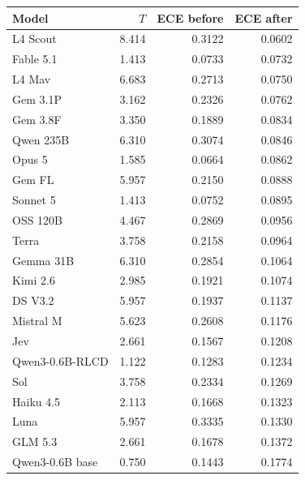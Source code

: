 \begin{tabular}{lrrr}
\toprule
Model & $T$ & ECE before & ECE after \\
\midrule
L4 Scout & 8.414 & 0.3122 & 0.0602 \\
Fable 5.1 & 1.413 & 0.0733 & 0.0732 \\
L4 Mav & 6.683 & 0.2713 & 0.0750 \\
Gem 3.1P & 3.162 & 0.2326 & 0.0762 \\
Gem 3.8F & 3.350 & 0.1889 & 0.0834 \\
Qwen 235B & 6.310 & 0.3074 & 0.0846 \\
Opus 5 & 1.585 & 0.0664 & 0.0862 \\
Gem FL & 5.957 & 0.2150 & 0.0888 \\
Sonnet 5 & 1.413 & 0.0752 & 0.0895 \\
OSS 120B & 4.467 & 0.2869 & 0.0956 \\
Terra & 3.758 & 0.2158 & 0.0964 \\
Gemma 31B & 6.310 & 0.2854 & 0.1064 \\
Kimi 2.6 & 2.985 & 0.1921 & 0.1074 \\
DS V3.2 & 5.957 & 0.1937 & 0.1137 \\
Mistral M & 5.623 & 0.2608 & 0.1176 \\
Jev & 2.661 & 0.1567 & 0.1208 \\
Qwen3-0.6B-RLCD & 1.122 & 0.1283 & 0.1234 \\
Sol & 3.758 & 0.2334 & 0.1269 \\
Haiku 4.5 & 2.113 & 0.1668 & 0.1323 \\
Luna & 5.957 & 0.3335 & 0.1330 \\
GLM 5.3 & 2.661 & 0.1678 & 0.1372 \\
Qwen3-0.6B base & 0.750 & 0.1443 & 0.1774 \\
\bottomrule
\end{tabular}
